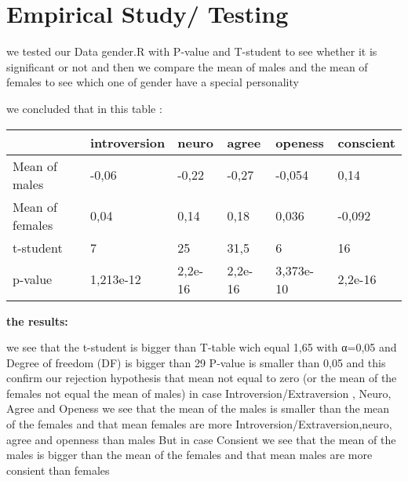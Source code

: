 \section{Empirical Study/ Testing}



we tested our Data gender.R with P-value and T-student  to see whether it is significant or not  and then we compare  the mean of males and the mean of  females  to see which one of gender have a special personality 

we concluded that in this table :

\begin{table}[ht]
    \begin{center}
        {\footnotesize
        \begin{tabular}{l|l|l|l|l|l|}
        \hline \hline
               & introversion   & neuro    & agree   & openess   & conscient        \\
            \hline
                Mean of males    & -0,06 & -0,22   & -0,27 & -0,054 & 0,14   \\
                Mean of females  & 0,04 & 0,14 & 0,18 & 0,036 & -0,092  \\
                t-student        & 7 & 25 & 31,5 & 6 & 16   \\
                p-value          & 1,213e-12 & 2,2e-16 & 2,2e-16 & 3,373e-10 & 2,2e-16   \\
               
            \hline \hline
        \end{tabular}}
    \end{center}
    
\end{table}

{\normalsize{\bf the results:}} \\\vspace{0.5cm}


we see that the t-student is bigger than T-table wich equal 1,65  with α=0,05     and  Degree of freedom (DF) is bigger than 29
  P-value is smaller than 0,05
and this confirm our rejection hypothesis that mean not equal to zero (or the mean of the females not equal the mean of males) 
  in case Introversion/Extraversion , Neuro, Agree and Openess
we see that the mean of the males is smaller than  the mean of  the females and that mean females are more Introversion/Extraversion,neuro, agree and openness than males
But in case Consient we see that the mean of the males is bigger than  the mean of  the females and that mean males are more consient than females 
















